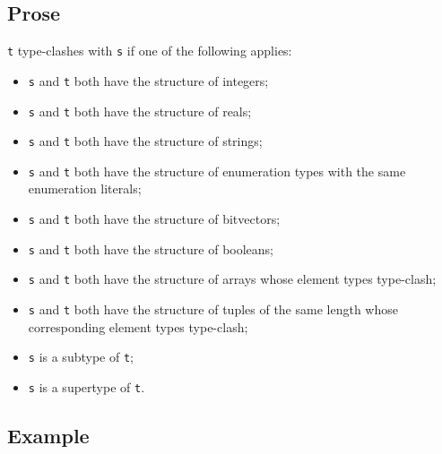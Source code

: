 \documentclass{book}
\begin{document}
  \subsection{Prose}
  \texttt{t} type-clashes with \texttt{s} if one of the following applies:
  \begin{itemize}
  \item \texttt{s} and \texttt{t} both have the structure of integers;
  \item \texttt{s} and \texttt{t} both have the structure of reals;
  \item \texttt{s} and \texttt{t} both have the structure of strings;
  \item \texttt{s} and \texttt{t} both have the structure of enumeration types with the same enumeration literals;
  \item \texttt{s} and \texttt{t} both have the structure of bitvectors;
  \item \texttt{s} and \texttt{t} both have the structure of booleans;
  \item \texttt{s} and \texttt{t} both have the structure of arrays whose element types type-clash;
  \item \texttt{s} and \texttt{t} both have the structure of tuples of the same length whose
    corresponding element types type-clash;
  \item \texttt{s} is a subtype of \texttt{t};
  \item \texttt{s} is a supertype of \texttt{t}.
  \end{itemize}

  \subsection{Example}


\end{document}
